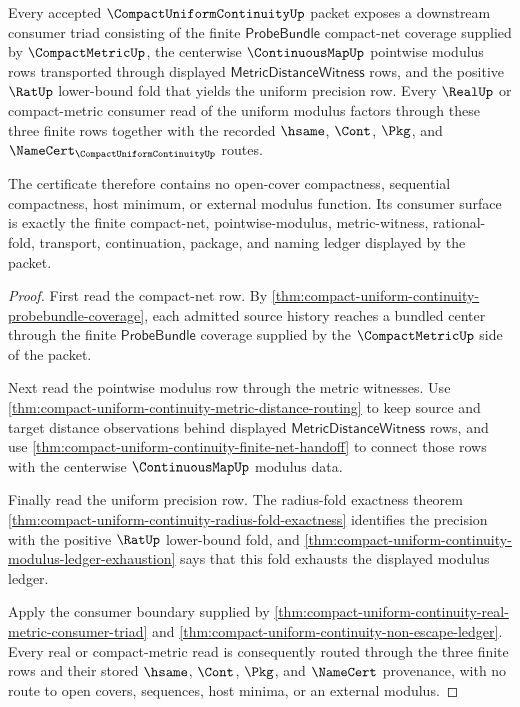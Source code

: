\begin{theorem}
\label{thm:compact-uniform-continuity-net-modulus-consumer-triad}
Every accepted $\CompactUniformContinuityUp$ packet exposes a downstream consumer triad consisting of the finite $\mathsf{ProbeBundle}$ compact-net coverage supplied by $\CompactMetricUp$, the centerwise $\ContinuousMapUp$ pointwise modulus rows transported through displayed $\mathsf{MetricDistanceWitness}$ rows, and the positive $\RatUp$ lower-bound fold that yields the uniform precision row. Every $\RealUp$ or compact-metric consumer read of the uniform modulus factors through these three finite rows together with the recorded $\hsame$, $\Cont$, $\Pkg$, and $\NameCert_{\CompactUniformContinuityUp}$ routes.

The certificate therefore contains no open-cover compactness, sequential compactness, host minimum, or external modulus function. Its consumer surface is exactly the finite compact-net, pointwise-modulus, metric-witness, rational-fold, transport, continuation, package, and naming ledger displayed by the packet.
\end{theorem}
\begin{proof}
First read the compact-net row. By \autoref{thm:compact-uniform-continuity-probebundle-coverage}, each admitted source history reaches a bundled center through the finite $\mathsf{ProbeBundle}$ coverage supplied by the $\CompactMetricUp$ side of the packet.

Next read the pointwise modulus row through the metric witnesses. Use \autoref{thm:compact-uniform-continuity-metric-distance-routing} to keep source and target distance observations behind displayed $\mathsf{MetricDistanceWitness}$ rows, and use \autoref{thm:compact-uniform-continuity-finite-net-handoff} to connect those rows with the centerwise $\ContinuousMapUp$ modulus data.

Finally read the uniform precision row. The radius-fold exactness theorem \autoref{thm:compact-uniform-continuity-radius-fold-exactness} identifies the precision with the positive $\RatUp$ lower-bound fold, and \autoref{thm:compact-uniform-continuity-modulus-ledger-exhaustion} says that this fold exhausts the displayed modulus ledger.

Apply the consumer boundary supplied by \autoref{thm:compact-uniform-continuity-real-metric-consumer-triad} and \autoref{thm:compact-uniform-continuity-non-escape-ledger}. Every real or compact-metric read is consequently routed through the three finite rows and their stored $\hsame$, $\Cont$, $\Pkg$, and $\NameCert$ provenance, with no route to open covers, sequences, host minima, or an external modulus.
\end{proof}

